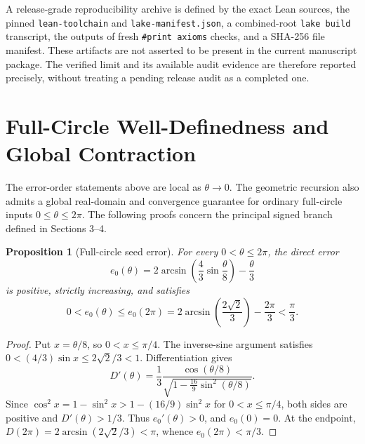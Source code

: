 \documentclass[11pt]{article}
\newtheorem{proposition}{Proposition}
\theoremstyle{remark}
\begin{document}
A release-grade reproducibility archive is defined by the exact Lean
sources, the pinned \texttt{lean-toolchain} and
\texttt{lake-manifest.json}, a combined-root \texttt{lake build}
transcript, the outputs of fresh \texttt{\#print axioms} checks, and a
SHA-256 file manifest. These artifacts are not asserted to be present
in the current manuscript package. The verified limit and its available
audit evidence are therefore reported precisely, without treating a
pending release audit as a completed one.


\section{Full-Circle Well-Definedness and Global Contraction}\label{sec:full-circle}

The error-order statements above are local as $\theta\to0$. The geometric
recursion also admits a global real-domain and convergence guarantee for
ordinary full-circle inputs $0\le\theta\le2\pi$. The following proofs
concern the principal signed branch defined in Sections 3--4.

\begin{proposition}[Full-circle seed error]\label{prop:full-circle-seed}
For every $0<\theta\le2\pi$, the direct error
\[
e_0(\theta)=2\arcsin\!\left(\frac43\sin\frac\theta8\right)-\frac\theta3
\]
is positive, strictly increasing, and satisfies
\[
0<e_0(\theta)\le e_0(2\pi)
=2\arcsin\!\left(\frac{2\sqrt2}{3}\right)-\frac{2\pi}{3}
<\frac\pi3.
\]
\end{proposition}
\begin{proof}
Put $x=\theta/8$, so $0<x\le\pi/4$. The inverse-sine argument
satisfies $0<(4/3)\sin x\le 2\sqrt2/3<1$.
Differentiation gives
\[
D'(\theta)=\frac13\frac{\cos(\theta/8)}
 {\sqrt{1-\frac{16}{9}\sin^2(\theta/8)}}.
\]
Since $\cos^2x=1-\sin^2x>1-(16/9)\sin^2x$ for
$0<x\le\pi/4$, both sides are positive and $D'(\theta)>1/3$.
Thus $e_0'(\theta)>0$, and $e_0(0)=0$.
At the endpoint, $D(2\pi)=2\arcsin(2\sqrt2/3)<\pi$,
whence $e_0(2\pi)<\pi/3$.
\end{proof}
\end{document}
